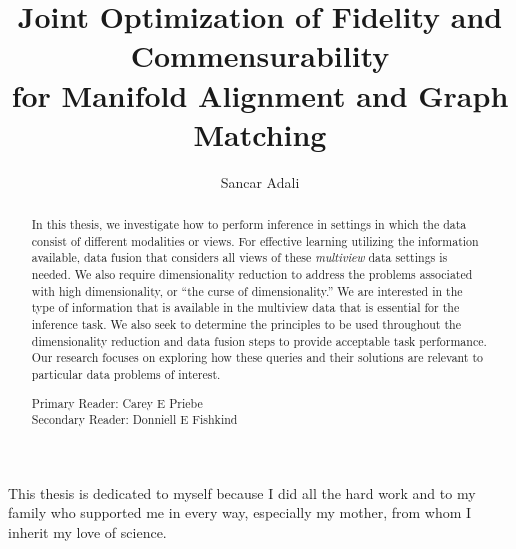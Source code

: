 \documentclass[12pt,oneside,final]{thesis}\usepackage[]{graphicx}\usepackage[]{color}
\begin{document}
\title{Joint Optimization of Fidelity and Commensurability\\ for Manifold Alignment and Graph Matching}
\author{Sancar Adali}
\dissertation
\doctorphilosophy
\copyrightnotice






\begin{frontmatter}

\maketitle

\begin{abstract}


In this thesis, we investigate how to perform inference in settings in which the data consist of different modalities or views. For effective learning utilizing the information available, data fusion that considers all views of these \emph{multiview} data settings is needed. We also require dimensionality reduction to address the problems associated with high dimensionality, or ``the curse of dimensionality.'' We are interested in the type of information that is available in the multiview data that is essential for the inference task. We also seek to determine the  principles to be used throughout the dimensionality reduction and data fusion steps to provide acceptable task performance. Our research focuses on exploring how these queries and their solutions are relevant to particular data problems of interest.


\vspace{1cm}

\noindent Primary Reader: Carey E Priebe\\
Secondary Reader: Donniell E Fishkind

\end{abstract}





\begin{dedication}
This thesis is dedicated to myself because I did all the hard work and to my family who supported me in every way, especially my mother, from whom I inherit my love of science. 

\end{dedication}

\tableofcontents

\listoftables

\listoffigures


\printnomenclature

\end{frontmatter}
\end{document}
